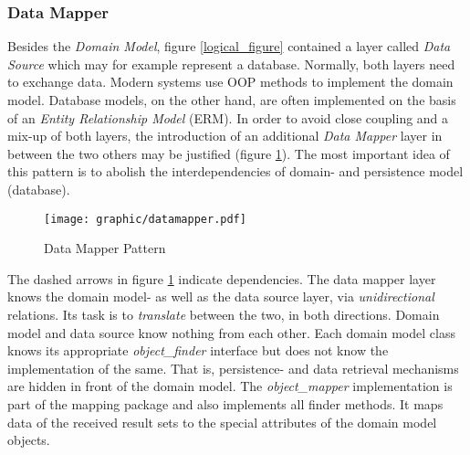 %
%
%
%
%
%
%

\subsubsection{Data Mapper}
\label{data_mapper_heading}

Besides the \emph{Domain Model}, figure \ref{logical_figure} contained a layer
called \emph{Data Source} which may for example represent a database. Normally,
both layers need to exchange data. Modern systems use OOP methods to implement
the domain model. Database models, on the other hand, are often implemented on
the basis of an \emph{Entity Relationship Model} (ERM). In order to avoid close
coupling and a mix-up of both layers, the introduction of an additional
\emph{Data Mapper} layer \cite{fowler2002} in between the two others may be
justified (figure \ref{datamapper_figure}). The most important idea of this
pattern is to abolish the interdependencies of domain- and persistence model
(database).

\begin{figure}[ht]
    \begin{center}
        \texttt{[image: graphic/datamapper.pdf]}
        \caption{Data Mapper Pattern}
        \label{datamapper_figure}
    \end{center}
\end{figure}

The dashed arrows in figure \ref{datamapper_figure} indicate dependencies. The
data mapper layer knows the domain model- as well as the data source layer, via
\emph{unidirectional} relations. Its task is to \emph{translate} between the
two, in both directions. Domain model and data source know nothing from each
other. Each domain model class knows its appropriate \emph{object\_finder}
interface but does not know the implementation of the same. That is,
persistence- and data retrieval mechanisms are hidden in front of the domain
model. The \emph{object\_mapper} implementation is part of the mapping package
and also implements all finder methods. It maps data of the received result
sets to the special attributes of the domain model objects.

